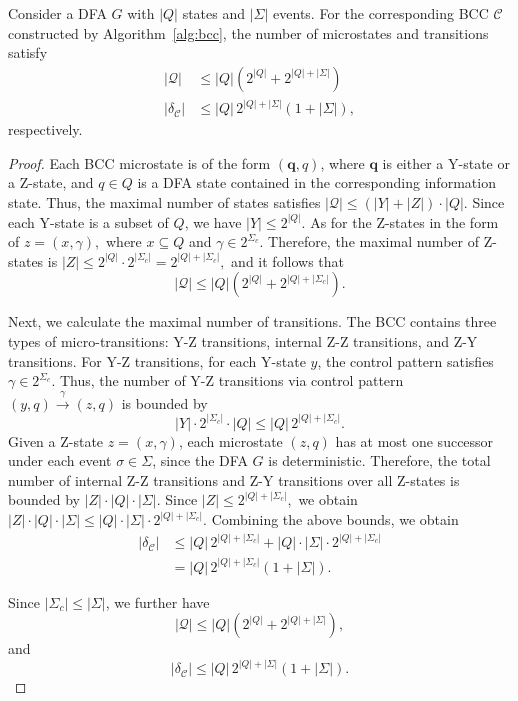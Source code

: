 \documentclass[journal,twoside,web]{ieeecolor}
\begin{document}
\begin{proposition}\label{prop:state_bcc}
Consider a DFA $G$ with $|Q|$ states and $|\Sigma|$ events. For the corresponding BCC $\mathcal{C}$ constructed by Algorithm~\ref{alg:bcc}, the number of microstates and transitions satisfy
$$
\begin{aligned}
    |\bm{\mathcal{Q}}|
    &\leq
    |Q|(2^{|Q|}+2^{|Q|+|\Sigma|}) \\
    |\delta_{\mathcal{C}}|
    &\leq
    |Q|\,2^{|Q|+|\Sigma|}(1+|\Sigma|),
\end{aligned}
$$
respectively.
\end{proposition}

\begin{proof}
Each BCC microstate is of the form $(\bm{q},q)$, where $\bm{q}$ is either a Y-state or a Z-state, and $q\in Q$ is a DFA state contained in the corresponding information state.
Thus, the maximal number of states satisfies
$
    |\bm{\mathcal{Q}}|
    \leq
    (|Y|+|Z|)\cdot |Q|.
$
Since each Y-state is a subset of $Q$, we have
$
    |Y|\leq 2^{|Q|}.
$
As for the Z-states in the form of
$
    z=(x,\gamma),
$
where $x\subseteq Q$ and $\gamma\in 2^{\Sigma_c}$. 
Therefore, the maximal number of Z-states is
$
    |Z|\leq 2^{|Q|}\cdot 2^{|\Sigma_c|}
    =
    2^{|Q|+|\Sigma_c|},
$
and it follows that
$$
    |\bm{\mathcal{Q}}|
    \leq
    |Q|(2^{|Q|}+2^{|Q|+|\Sigma_c|}).
$$

Next, we calculate the maximal number of transitions. 
The BCC contains three types of micro-transitions: Y-Z transitions, internal Z-Z transitions, and Z-Y transitions.
%
For Y-Z transitions, for each Y-state $y$, the control pattern satisfies $\gamma \in 2^{\Sigma_c}$.
Thus, the number of Y-Z transitions via control pattern $(y,q)\xrightarrow{\gamma}(z,q)$ is bounded by
$$
    |Y|\cdot 2^{|\Sigma_c|}\cdot |Q|
    \leq
    |Q|\,2^{|Q|+|\Sigma_c|}.
$$
%
Given a Z-state $z=(x,\gamma)$, each microstate $(z,q)$ has at most one successor
under each event $\sigma\in\Sigma$, since the DFA $G$ is deterministic.
Therefore, the total number of internal Z-Z transitions and Z-Y transitions over all Z-states is bounded by
$
    |Z|\cdot |Q|\cdot|\Sigma|.
$
Since
$
    |Z|\leq 2^{|Q|+|\Sigma_c|},
$
we obtain
$
    |Z|\cdot |Q|\cdot|\Sigma|
    \leq
    |Q|\cdot|\Sigma|\cdot 2^{|Q|+|\Sigma_c|}.
$
%
Combining the above bounds, we obtain
$$
\begin{aligned}
    |\delta_{\mathcal{C}}|
    &\leq
    |Q|\,2^{|Q|+|\Sigma_c|}
    +
    |Q|\cdot|\Sigma|\cdot 2^{|Q|+|\Sigma_c|} \\
    &=
    |Q|\,2^{|Q|+|\Sigma_c|}(1+|\Sigma|).
\end{aligned}
$$

Since $|\Sigma_c|\leq|\Sigma|$, we further have
$$
    |\bm{\mathcal{Q}}|
    \leq
    |Q|(2^{|Q|}+2^{|Q|+|\Sigma|}),
$$
and
$$
    |\delta_{\mathcal{C}}|
    \leq
    |Q|\,2^{|Q|+|\Sigma|}(1+|\Sigma|).
$$
\end{proof}
\end{document}
